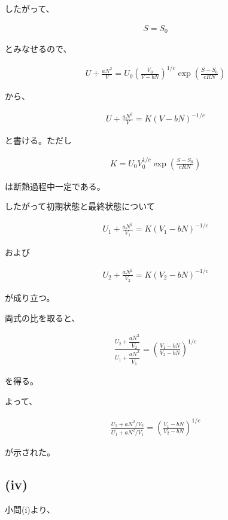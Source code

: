 \documentclass[platex,dvipdfmx,a4paper]{jsarticle}
\begin{document}
したがって、

\begin{align*}
S=S_0
\end{align*}

とみなせるので、

\begin{align*}
U+\frac{aN^2}{V}
=
U_0
\left(
\frac{V_0}{V-bN}
\right)^{1/c}
\exp\left(
\frac{S-S_0}{cRN}
\right)
\end{align*}

から、

\begin{align*}
U+\frac{aN^2}{V}
=
K(V-bN)^{-1/c}
\end{align*}

と書ける。ただし

\begin{align*}
K
=
U_0V_0^{1/c}
\exp\left(
\frac{S-S_0}{cRN}
\right)
\end{align*}

は断熱過程中一定である。

したがって初期状態と最終状態について

\begin{align*}
U_1+\frac{aN^2}{V_1}
=
K(V_1-bN)^{-1/c}
\end{align*}

および

\begin{align*}
U_2+\frac{aN^2}{V_2}
=
K(V_2-bN)^{-1/c}
\end{align*}

が成り立つ。

両式の比を取ると、

\begin{align*}
\frac{
U_2+\dfrac{aN^2}{V_2}
}{
U_1+\dfrac{aN^2}{V_1}
}
=
\left(
\frac{V_1-bN}{V_2-bN}
\right)^{1/c}
\end{align*}

を得る。

よって、

\begin{align*}
\frac{
U_2+aN^2/V_2
}{
U_1+aN^2/V_1
}
=
\left(
\frac{V_1-bN}{V_2-bN}
\right)^{1/c}
\end{align*}

が示された。

\subsection{(iv)}

小問(i)より、
\end{document}
